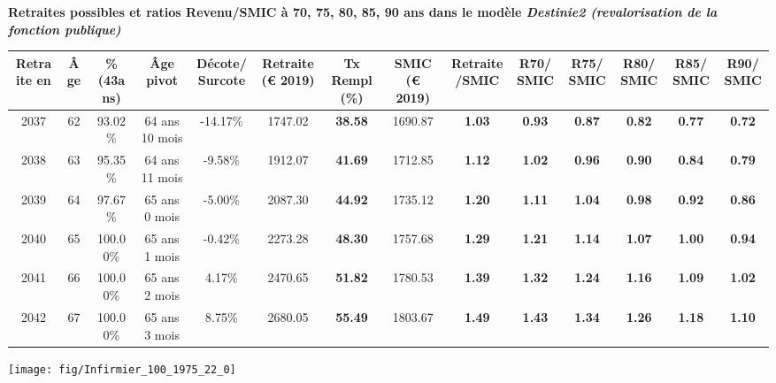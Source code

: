  \vspace{0.1cm} 
{\bf \noindent Retraites possibles et ratios Revenu/SMIC à 70, 75, 80, 85, 90 ans dans le modèle \emph{Destinie2 (revalorisation de la fonction publique)}}  
 
\begin{adjustbox}{max width=\textwidth} 
\begin{tabular}[htb]{|c|c||c|c|c||c|c||c|c||c|c|c|c|c|} 
\hline 
 Retraite en &  Âge &  \%(43ans) &  Âge pivot &  Décote/Surcote &  Retraite (\euro{} 2019) &  Tx Rempl(\%) &  SMIC (\euro{} 2019) &  Retraite/SMIC &  R70/SMIC &  R75/SMIC &  R80/SMIC &  R85/SMIC &  R90/SMIC \\ 
\hline \hline 
 2037 &  62 &  93.02\% &  64 ans 10 mois &  -14.17\% &  1747.02 &  {\bf 38.58} &  1690.87 &  {\bf 1.03} &  {\bf {\color{red} 0.93}} &  {\bf {\color{red} 0.87}} &  {\bf {\color{red} 0.82}} &  {\bf {\color{red} 0.77}} &  {\bf {\color{red} 0.72}} \\ 
\hline 
 2038 &  63 &  95.35\% &  64 ans 11 mois &  -9.58\% &  1912.07 &  {\bf 41.69} &  1712.85 &  {\bf 1.12} &  {\bf 1.02} &  {\bf {\color{red} 0.96}} &  {\bf {\color{red} 0.90}} &  {\bf {\color{red} 0.84}} &  {\bf {\color{red} 0.79}} \\ 
\hline 
 2039 &  64 &  97.67\% &  65 ans 0 mois &  -5.00\% &  2087.30 &  {\bf 44.92} &  1735.12 &  {\bf 1.20} &  {\bf 1.11} &  {\bf 1.04} &  {\bf {\color{red} 0.98}} &  {\bf {\color{red} 0.92}} &  {\bf {\color{red} 0.86}} \\ 
\hline 
 2040 &  65 &  100.00\% &  65 ans 1 mois &  -0.42\% &  2273.28 &  {\bf 48.30} &  1757.68 &  {\bf 1.29} &  {\bf 1.21} &  {\bf 1.14} &  {\bf 1.07} &  {\bf {\color{red} 1.00}} &  {\bf {\color{red} 0.94}} \\ 
\hline 
 2041 &  66 &  100.00\% &  65 ans 2 mois &  4.17\% &  2470.65 &  {\bf 51.82} &  1780.53 &  {\bf 1.39} &  {\bf 1.32} &  {\bf 1.24} &  {\bf 1.16} &  {\bf 1.09} &  {\bf 1.02} \\ 
\hline 
 2042 &  67 &  100.00\% &  65 ans 3 mois &  8.75\% &  2680.05 &  {\bf 55.49} &  1803.67 &  {\bf 1.49} &  {\bf 1.43} &  {\bf 1.34} &  {\bf 1.26} &  {\bf 1.18} &  {\bf 1.10} \\ 
\hline 
\hline 
\end{tabular} 
\end{adjustbox} 
 
 \vspace{0.1cm} 

 {\hspace{-2.2cm}\texttt{[image: fig/Infirmier\_100\_1975\_22\_0]}} 

